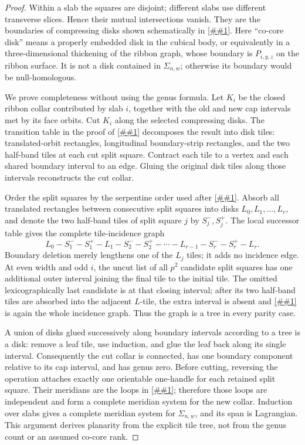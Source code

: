 \documentclass[11pt]{article}
\newcommand{\cref}[1]{\autoref{##1}}%
\begin{document}
\begin{proof}
Within a slab the squares are disjoint; different slabs use different
transverse slices.  Hence their mutual intersections vanish.  They are the
boundaries of compressing disks shown schematically in
\cref{fig:slab-cocores}.  Here ``co-core disk'' means a properly embedded disk
in the cubical body, or equivalently in a three-dimensional thickening of the
ribbon graph, whose boundary is \(P_{i,y,z}\) on the ribbon surface.  It is
not a disk contained in \(\Sigma_{n,w}\); otherwise its boundary would be
null-homologous.

We prove completeness without using the genus formula.  Let \(K_i\) be the
closed ribbon collar contributed by slab \(i\), together with the old and new
cap intervals met by its face orbits.  Cut \(K_i\) along the selected
compressing disks.  The transition table in the proof of
\cref{prop:genus} decomposes the result into disk tiles: translated-orbit
rectangles, longitudinal boundary-strip rectangles, and the two half-band
tiles at each cut split square.  Contract each tile to a vertex and each
shared boundary interval to an edge.  Gluing the original disk tiles along
those intervals reconstructs the cut collar.

Order the split squares by the serpentine order used after
\cref{eq:split-parity}.  Absorb all translated rectangles between consecutive
split squares into disks \(L_0,L_1,\ldots,L_r\), and denote the two half-band
tiles of split square \(j\) by \(S_j^-,S_j^+\).  The local successor table
gives the complete tile-incidence graph
\begin{equation}\label{eq:collar-tree}
 L_0-S_1^- -S_1^+ -L_1-S_2^- -S_2^+-\cdots-
 L_{r-1}-S_r^- -S_r^+-L_r .
\end{equation}
Boundary deletion merely lengthens one of the \(L_j\) tiles; it adds no
incidence edge.  At even width and odd \(i\), the uncut list of all \(p^2\)
candidate split squares has one additional outer interval joining the final
tile to the initial tile.  The omitted lexicographically last candidate is
at that closing interval; after its two half-band tiles are absorbed into
the adjacent \(L\)-tile, the extra interval is absent and
\cref{eq:collar-tree} is again the whole incidence graph.  Thus the graph is
a tree in every parity case.

A union of disks glued successively along boundary intervals according to a
tree is a disk: remove a leaf tile, use induction, and glue the leaf back
along its single interval.  Consequently the cut collar is connected, has
one boundary component relative to its cap interval, and has genus zero.
Before cutting, reversing the operation attaches exactly one orientable
one-handle for each retained split square.  Their meridians are the loops in
\cref{eq:Ais}; therefore those loops are independent and form a complete
meridian system for the new collar.  Induction over slabs gives a complete
meridian system for \(\Sigma_{n,w}\), and its span is Lagrangian.  This
argument derives planarity from the explicit tile tree, not from the genus
count or an assumed co-core rank.


\end{proof}
\end{document}
